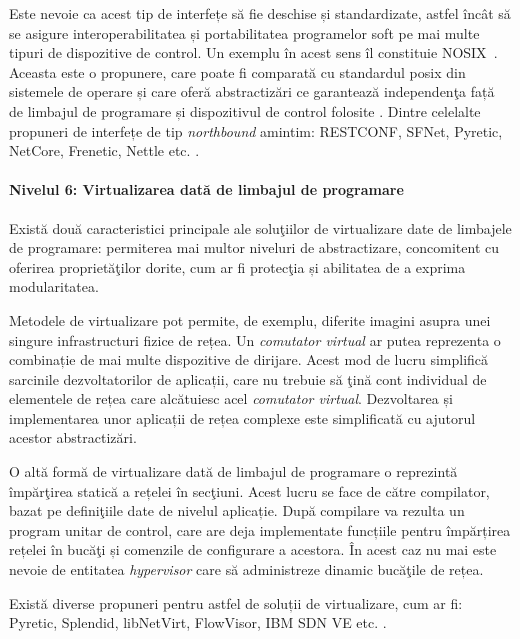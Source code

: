 Este nevoie ca acest tip de interfețe să fie deschise și standardizate, astfel încât să se asigure interoperabilitatea și portabilitatea programelor soft pe mai multe tipuri de dispozitive de control. Un exemplu în acest sens îl constituie NOSIX~\cite{wundsam2012nosix}. Aceasta este o propunere, care poate fi comparată cu standardul \gls{posix} din sistemele de operare și care oferă abstractizări ce garantează independenţa față de limbajul de programare și dispozitivul de control folosite \cite{barney2009posix}. Dintre celelalte propuneri de interfețe de tip \textit{northbound} amintim: RESTCONF, SFNet, Pyretic, NetCore, Frenetic, Nettle etc. \cite{bierman2017restconf, yap2010towards, reich2013modular, monsanto2012compiler}.

\paragraph{Nivelul 6: Virtualizarea dată de limbajul de programare}

Există două caracteristici principale ale soluţiilor de virtualizare date de limbajele de programare: permiterea mai multor niveluri de abstractizare, concomitent cu oferirea proprietăţilor dorite, cum ar fi protecţia și abilitatea de a exprima modularitatea.

Metodele de virtualizare pot permite, de exemplu, diferite imagini asupra unei singure infrastructuri fizice de rețea. Un \textit{comutator virtual} ar putea reprezenta o combinație de mai multe dispozitive de dirijare. Acest mod de lucru simplifică sarcinile dezvoltatorilor de aplicații, care nu trebuie să ţină cont individual de elementele de rețea care alcătuiesc acel \textit{comutator virtual}. Dezvoltarea și implementarea unor aplicații de rețea complexe este simplificată cu ajutorul acestor abstractizări.

O altă formă de virtualizare dată de limbajul de programare o reprezintă împărţirea statică a rețelei în secţiuni. Acest lucru se face de către compilator, bazat pe definiţiile date de nivelul aplicație. După compilare va rezulta un program unitar de control, care are deja implementate funcțiile pentru împărțirea rețelei în bucăţi și comenzile de configurare a acestora. În acest caz nu mai este nevoie de entitatea \textit{hypervisor} care să administreze dinamic bucăţile de rețea.

Există diverse propuneri pentru astfel de soluții de virtualizare, cum ar fi: Pyretic, Splendid, libNetVirt, FlowVisor, IBM SDN VE etc. \cite{reich2013modular, schlesinger2012splendid, turull2012libnetvirt, sherwood2009flowvisor}.

